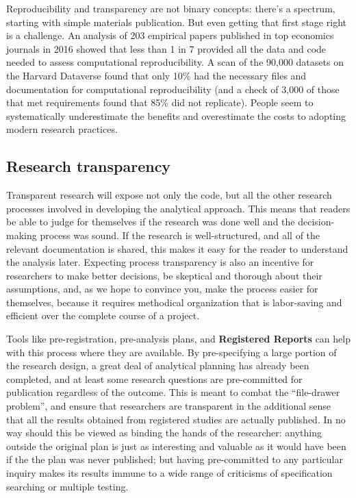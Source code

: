 Reproducibility and transparency are not binary concepts:
there's a spectrum, starting with simple materials publication.
But even getting that first stage right is a challenge.
An analysis of 203 empirical papers published in top economics journals in 2016
showed that less than 1 in 7 provided all the data and code
needed to assess computational reproducibility.\cite{galiani2017incentives}
A scan of the 90,000 datasets on the Harvard Dataverse
found that only 10\% had the necessary files and documentation
for computational reproducibility
(and a check of 3,000 of those that met requirements
found that 85\% did not replicate).
People seem to systematically underestimate the benefits
and overestimate the costs to adopting modern research practices.

\subsection{Research transparency}

Transparent research will expose not only the code,
but all the other research processes involved in developing the analytical approach.
This means that readers be able to judge for themselves if the research was done well
and the decision-making process was sound.
If the research is well-structured, and all of the relevant documentation
is shared, this makes it easy for the reader to understand the analysis later.
Expecting process transparency is also an incentive for researchers to make better decisions,
be skeptical and thorough about their assumptions,
and, as we hope to convince you, make the process easier for themselves,
because it requires methodical organization that is labor-saving and efficient over the complete course of a project.

Tools like pre-registration, pre-analysis plans, and
\textbf{Registered Reports}
can help with this process where they are available.
By pre-specifying a large portion of the research design,
a great deal of analytical planning has already been completed,
and at least some research questions are pre-committed for publication regardless of the outcome.
This is meant to combat the ``file-drawer problem'',\cite{simonsohn2014p}
and ensure that researchers are transparent in the additional sense that
all the results obtained from registered studies are actually published.
In no way should this be viewed as binding the hands of the researcher:
anything outside the original plan is just as interesting and valuable
as it would have been if the the plan was never published;
but having pre-committed to any particular inquiry makes its results
immune to a wide range of criticisms of specification searching or multiple testing.

